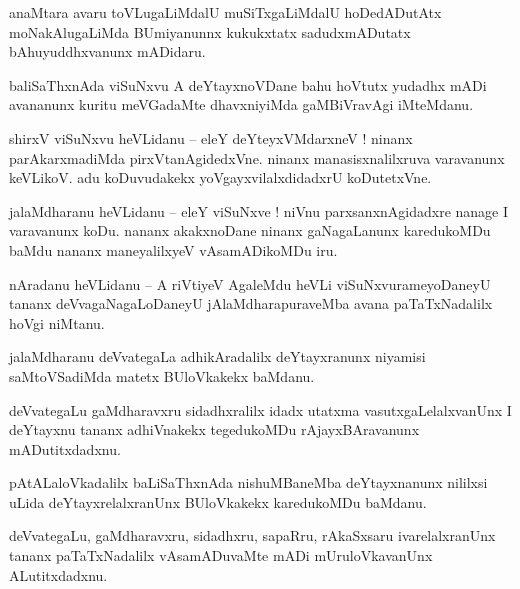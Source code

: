 \documentclass{article}
\begin{document}
\begin{mn}%
anaMtara avaru toVLugaLiMdalU muSiTxgaLiMdalU hoDedADutAtx moNakAlugaLiMda BUmiyanunnx kukukxtatx 
sadudxmADutatx bAhuyuddhxvanunx mADidaru.
\end{mn}

\begin{mn}%
baliSaThxnAda viSuNxvu A deYtayxnoVDane bahu hoVtutx yudadhx mADi avananunx kuritu meVGadaMte 
dhavxniyiMda gaMBiVravAgi iMteMdanu.
\end{mn}

\begin{mn}%
shirxV viSuNxvu heVLidanu -- eleY deYteyxVMdarxneV ! ninanx parAkarxmadiMda pirxVtanAgidedxVne. 
ninanx manasisxnalilxruva varavanunx keVLikoV. adu koDuvudakekx yoVgayxvilalxdidadxrU koDutetxVne.
\end{mn}

\begin{mn}%
jalaMdharanu heVLidanu -- eleY viSuNxve ! niVnu parxsanxnAgidadxre nanage I varavanunx koDu. nananx 
akakxnoDane ninanx gaNagaLanunx karedukoMDu baMdu nananx maneyalilxyeV vAsamADikoMDu iru.
\end{mn}

\begin{mn}%
nAradanu heVLidanu -- A riVtiyeV AgaleMdu heVLi viSuNxvurameyoDaneyU tananx deVvagaNagaLoDaneyU 
jAlaMdharapuraveMba avana paTaTxNadalilx hoVgi niMtanu.
\end{mn}

\begin{mn}%
jalaMdharanu deVvategaLa adhikAradalilx deYtayxranunx niyamisi saMtoVSadiMda matetx BUloVkakekx 
baMdanu.
\end{mn}

\begin{mn}%
deVvategaLu gaMdharavxru sidadhxralilx idadx utatxma vasutxgaLelalxvanUnx I deYtayxnu tananx 
adhiVnakekx tegedukoMDu rAjayxBAravanunx mADutitxdadxnu.
\end{mn}

\begin{mn}%
pAtALaloVkadalilx baLiSaThxnAda nishuMBaneMba deYtayxnanunx nililxsi uLida deYtayxrelalxranUnx 
BUloVkakekx karedukoMDu baMdanu.
\end{mn}

\begin{mn}%
deVvategaLu, gaMdharavxru, sidadhxru, sapaRru, rAkaSxsaru ivarelalxranUnx tananx paTaTxNadalilx 
vAsamADuvaMte mADi mUruloVkavanUnx ALutitxdadxnu.
\end{mn}
\end{document}
